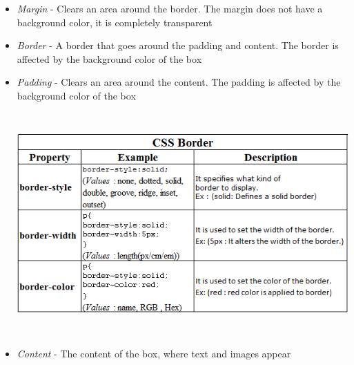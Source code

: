 \documentclass[11pt,a4paper]{article}
\begin{document}
\begin{itemize}
\item \emph{Margin} - Clears an area around the border. The margin does not have a background color, it is completely transparent
\item \emph{Border} - A border that goes around the padding and content. The border is affected by the background color of the box
\item \emph{Padding} - Clears an area around the content. The padding is affected by the background color of the box
\begin{center}
\includegraphics[width = 150mm, height = 85mm]{CSSBorder.png}\\
\end{center}
\item \emph{Content} - The content of the box, where text and images appear
\end{itemize}
\end{document}
